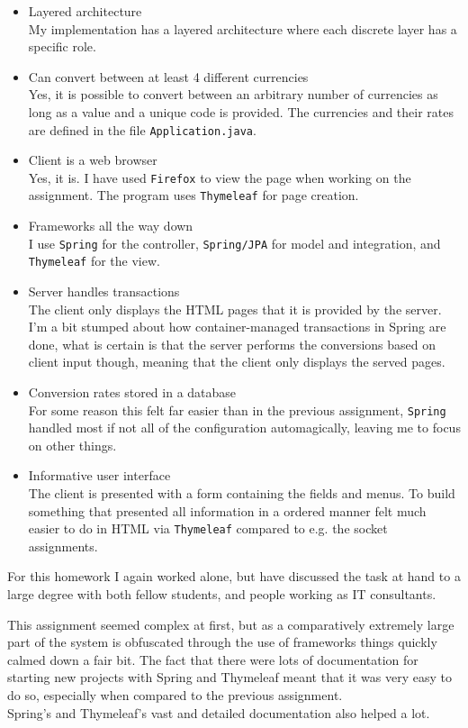 \documentclass[a4paper]{scrartcl}
\begin{document}
\begin{itemize}
	\item{
		Layered architecture\\
		My implementation has a layered architecture where each discrete layer has a specific role.
	}
	\item{
		Can convert between at least 4 different currencies\\
		Yes, it is possible to convert between an arbitrary number of currencies as long as a value and a unique code is provided. The currencies and their rates are defined in the file \texttt{Application.java}.
	}
	\item{
		Client is a web browser\\
		Yes, it is. I have used \texttt{Firefox} to view the page when working on the assignment. The program uses \texttt{Thymeleaf} for page creation.
	}
	\item{
		Frameworks all the way down\\
		I use \texttt{Spring} for the controller, \texttt{Spring/JPA} for model and integration, and \texttt{Thymeleaf} for the view.
	}
	\item{
		Server handles transactions\\
		The client only displays the HTML pages that it is provided by the server.
		I'm a bit stumped about how container-managed transactions in Spring are done, what is certain is that the server performs the conversions based on client input though, meaning that the client only displays the served pages.
	}
	\item{
		Conversion rates stored in a database\\
		For some reason this felt far easier than in the previous assignment, \texttt{Spring} handled most if not all of the configuration automagically, leaving me to focus on other things.
	}
	\item{
		Informative user interface\\
		The client is presented with a form containing the fields and menus. To build something that presented all information in a ordered manner felt much easier to do in HTML via \texttt{Thymeleaf} compared to e.g. the socket assignments.
	}
\end{itemize}

For this homework I again worked alone, but have discussed the task at hand to a large degree with both fellow students, and people working as IT consultants. 

This assignment seemed complex at first, but as a comparatively extremely large part of the system is obfuscated through the use of frameworks things quickly calmed down a fair bit. The fact that there were lots of documentation for starting new projects with Spring and Thymeleaf meant that it was very easy to do so, especially when compared to the previous assignment.\\
Spring's and Thymeleaf's vast and detailed documentation also helped a lot.
\end{document}
